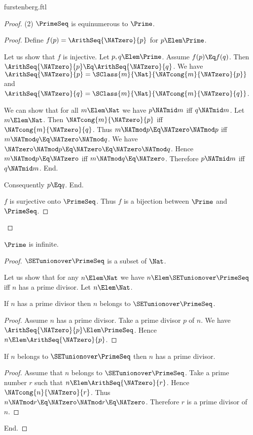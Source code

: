 \documentclass{stex}
\begin{document}
\begin{smodule}{furstenberg.ftl}
\begin{forthel}
\begin{proof}
    (2) $\PrimeSeq$ is equinumerous to $\Prime$.
    \begin{proof}
      Define $f(p) = \ArithSeq{\NATzero}{p}$ for $p \Elem \Prime$.

      Let us show that $f$ is injective.
        Let $p, q \Elem \Prime$.
        Assume $f(p) \Eq f(q)$.
        Then $\ArithSeq{\NATzero}{p} \Eq \ArithSeq{\NATzero}{q}$.
        We have $\ArithSeq{\NATzero}{p} = \SClass{m}{\Nat}{\NATcong{m}{\NATzero}{p}}$ and
        $\ArithSeq{\NATzero}{q} =\linebreak \SClass{m}{\Nat}{\NATcong{m}{\NATzero}{q}}$.

        We can show that for all $m \Elem \Nat$ we have $p \NATmid m$ iff $q \NATmid m$.
          Let $m \Elem \Nat$.
          Then $\NATcong{m}{\NATzero}{p}$ iff $\NATcong{m}{\NATzero}{q}$.
          Thus $m \NATmod p \Eq \NATzero \NATmod p$ iff $m \NATmod q \Eq\linebreak \NATzero \NATmod q$.
          We have $\NATzero \NATmod p \Eq \NATzero \Eq \NATzero \NATmod q$.
          Hence $m \NATmod p \Eq \NATzero$ iff $m \NATmod q \Eq\linebreak \NATzero$.
          Therefore $p \NATmid m$ iff $q \NATmid m$.
        End.

        Consequently $p \Eq q$.
      End.

      $f$ is surjective onto $\PrimeSeq$.
      Thus $f$ is a bijection between $\Prime$ and $\PrimeSeq$.
    \end{proof}
  \end{proof}

  \begin{theorem}[title=Furstenberg,name=Furstenberg]
    $\Prime$ is infinite.
  \end{theorem}
  \begin{proof}
    $\SETunionover \PrimeSeq$ is a subset of $\Nat$.

    Let us show that for any $n \Elem \Nat$ we have $n \Elem \SETunionover \PrimeSeq$ iff $n$
    has a prime divisor.
      Let $n \Elem \Nat$.

      If $n$ has a prime divisor then $n$ belongs to $\SETunionover \PrimeSeq$.
      \begin{proof}
        Assume $n$ has a prime divisor.
        Take a prime divisor $p$ of $n$.
        We have $\ArithSeq{\NATzero}{p} \Elem \PrimeSeq$.
        Hence $n \Elem \ArithSeq{\NATzero}{p}$.
      \end{proof}

      If $n$ belongs to $\SETunionover \PrimeSeq$ then $n$ has a prime divisor.
      \begin{proof}
        Assume that $n$ belongs to $\SETunionover \PrimeSeq$.
        Take a prime number $r$ such that $n \Elem \ArithSeq{\NATzero}{r}$.
        Hence $\NATcong{n}{\NATzero}{r}$.
        Thus $n \NATmod r \Eq \NATzero \NATmod r \Eq \NATzero$.
        Therefore $r$ is a prime divisor of $n$.
      \end{proof}
    End.


\end{proof}
\end{forthel}
\end{smodule}
\end{document}
